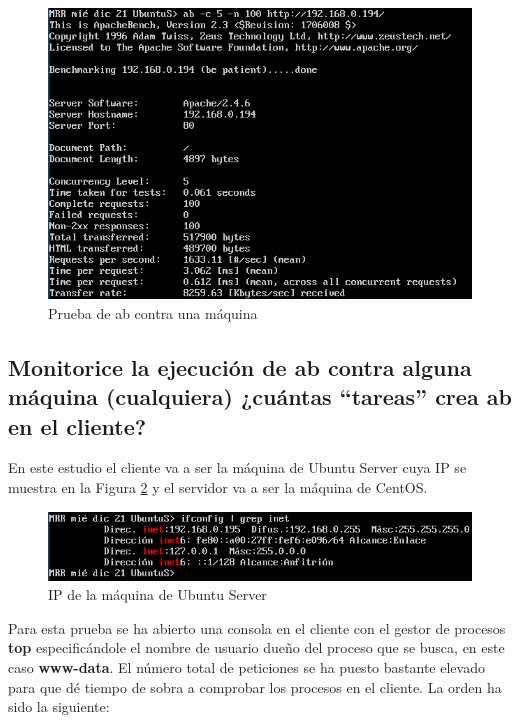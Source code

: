 \begin{figure}[H] %
	\centering
	\includegraphics[scale=0.9]{figuras/ejercicio2/figura2-1.png} 
	\caption{Prueba de ab contra una máquina} 
	\label{fig:figura2-1}
\end{figure}

\newpage

\subsection{Monitorice la ejecución de ab contra alguna
	máquina (cualquiera) ¿cuántas “tareas” crea ab en el cliente?}

En este estudio el cliente va a ser la máquina de Ubuntu Server cuya IP se muestra en la Figura \ref{fig:figura2-3} y el servidor va a ser la máquina de CentOS.

\begin{figure}[H] %
	\centering
	\includegraphics[scale=0.9]{figuras/ejercicio2/figura2-3.png} 
	\caption{IP de la máquina de Ubuntu Server} 
	\label{fig:figura2-3}
\end{figure}
\vspace{-10pt}
Para esta prueba se ha abierto una consola en el cliente con el gestor de procesos \textbf{top} \cite{enlace5} especificándole el nombre de usuario dueño del proceso que se busca, en este caso \textbf{www-data}. El número total de peticiones se ha puesto bastante elevado para que dé tiempo de sobra a comprobar los procesos en el cliente. La orden ha sido la siguiente:

